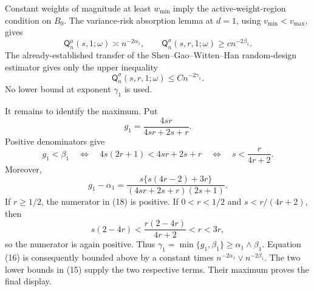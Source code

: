 Constant weights of magnitude at least \(w_{\min}\) imply the active-weight-region condition on \(B_0\).  The variance-risk absorption lemma at \(d=1\), using \(v_{\min}<v_{\max}\), gives
\[
\mathsf Q_n^{\mu}(s,1;\omega)\asymp n^{-2\alpha_1},
\qquad
\mathsf Q_n^{\sigma}(s,r,1;\omega)\geq c n^{-2\beta_1}.
\tag{15}
\]
The already-established transfer of the Shen--Gao--Witten--Han random-design estimator gives only the upper inequality
\[
\mathsf Q_n^{\sigma}(s,r,1;\omega)\leq Cn^{-2\gamma_1}.
\tag{16}
\]
No lower bound at exponent \(\gamma_1\) is used.

It remains to identify the maximum.  Put
\[
g_1=\frac{4sr}{4sr+2s+r}.
\]
Positive denominators give
\[
g_1<\beta_1
\quad\Longleftrightarrow\quad
4s(2r+1)<4sr+2s+r
\quad\Longleftrightarrow\quad
s<\frac{r}{4r+2}.
\tag{17}
\]
Moreover,
\[
g_1-\alpha_1
=\frac{s\{s(4r-2)+3r\}}
{(4sr+2s+r)(2s+1)}.
\tag{18}
\]
If \(r\geq1/2\), the numerator in (18) is positive.  If \(0<r<1/2\) and \(s<r/(4r+2)\), then
\[
s(2-4r)<\frac{r(2-4r)}{4r+2}<r<3r,
\]
so the numerator is again positive.  Thus \(\gamma_1=\min\{g_1,\beta_1\}\geq\alpha_1\wedge\beta_1\).  Equation (16) is consequently bounded above by a constant times \(n^{-2\alpha_1}\vee n^{-2\beta_1}\).  The two lower bounds in (15) supply the two respective terms.  Their maximum proves the final display.
